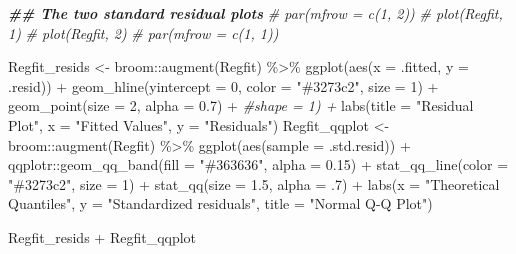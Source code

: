 \documentclass[
]{book}
\newenvironment{Shaded}{\begin{snugshade}}{\end{snugshade}}
\newcommand{\AttributeTok}[1]{\textcolor[rgb]{0.77,0.63,0.00}{#1}}
\newcommand{\CommentTok}[1]{\textcolor[rgb]{0.56,0.35,0.01}{\textit{#1}}}
\newcommand{\DecValTok}[1]{\textcolor[rgb]{0.00,0.00,0.81}{#1}}
\newcommand{\DocumentationTok}[1]{\textcolor[rgb]{0.56,0.35,0.01}{\textbf{\textit{#1}}}}
\newcommand{\FloatTok}[1]{\textcolor[rgb]{0.00,0.00,0.81}{#1}}
\newcommand{\FunctionTok}[1]{\textcolor[rgb]{0.00,0.00,0.00}{#1}}
\newcommand{\NormalTok}[1]{#1}
\newcommand{\OtherTok}[1]{\textcolor[rgb]{0.56,0.35,0.01}{#1}}
\newcommand{\SpecialCharTok}[1]{\textcolor[rgb]{0.00,0.00,0.00}{#1}}
\newcommand{\StringTok}[1]{\textcolor[rgb]{0.31,0.60,0.02}{#1}}
\begin{document}
\begin{Shaded}
\begin{Highlighting}[]
\DocumentationTok{\#\# The two standard residual plots}
\CommentTok{\# par(mfrow = c(1, 2))}
\CommentTok{\# plot(Regfit, 1)}
\CommentTok{\# plot(Regfit, 2)}
\CommentTok{\# par(mfrow = c(1, 1))}

\NormalTok{Regfit\_resids }\OtherTok{\textless{}{-}}\NormalTok{ broom}\SpecialCharTok{::}\FunctionTok{augment}\NormalTok{(Regfit) }\SpecialCharTok{\%\textgreater{}\%} 
  \FunctionTok{ggplot}\NormalTok{(}\FunctionTok{aes}\NormalTok{(}\AttributeTok{x =}\NormalTok{ .fitted, }\AttributeTok{y =}\NormalTok{ .resid)) }\SpecialCharTok{+} 
  \FunctionTok{geom\_hline}\NormalTok{(}\AttributeTok{yintercept =} \DecValTok{0}\NormalTok{, }\AttributeTok{color =} \StringTok{"\#3273c2"}\NormalTok{, }\AttributeTok{size =} \DecValTok{1}\NormalTok{) }\SpecialCharTok{+}
  \FunctionTok{geom\_point}\NormalTok{(}\AttributeTok{size =} \DecValTok{2}\NormalTok{, }\AttributeTok{alpha =} \FloatTok{0.7}\NormalTok{) }\SpecialCharTok{+} \CommentTok{\#shape = 1) +}
  \FunctionTok{labs}\NormalTok{(}\AttributeTok{title =} \StringTok{"Residual Plot"}\NormalTok{, }
       \AttributeTok{x =} \StringTok{"Fitted Values"}\NormalTok{, }
       \AttributeTok{y =} \StringTok{"Residuals"}\NormalTok{)}
\NormalTok{Regfit\_qqplot }\OtherTok{\textless{}{-}}\NormalTok{ broom}\SpecialCharTok{::}\FunctionTok{augment}\NormalTok{(Regfit) }\SpecialCharTok{\%\textgreater{}\%} 
  \FunctionTok{ggplot}\NormalTok{(}\FunctionTok{aes}\NormalTok{(}\AttributeTok{sample =}\NormalTok{ .std.resid)) }\SpecialCharTok{+}
\NormalTok{  qqplotr}\SpecialCharTok{::}\FunctionTok{geom\_qq\_band}\NormalTok{(}\AttributeTok{fill =} \StringTok{"\#363636"}\NormalTok{, }\AttributeTok{alpha =} \FloatTok{0.15}\NormalTok{) }\SpecialCharTok{+}
  \FunctionTok{stat\_qq\_line}\NormalTok{(}\AttributeTok{color =} \StringTok{"\#3273c2"}\NormalTok{, }\AttributeTok{size =} \DecValTok{1}\NormalTok{) }\SpecialCharTok{+}
  \FunctionTok{stat\_qq}\NormalTok{(}\AttributeTok{size =} \FloatTok{1.5}\NormalTok{, }\AttributeTok{alpha =}\NormalTok{ .}\DecValTok{7}\NormalTok{) }\SpecialCharTok{+}
  \FunctionTok{labs}\NormalTok{(}\AttributeTok{x =} \StringTok{"Theoretical Quantiles"}\NormalTok{,}
       \AttributeTok{y =} \StringTok{"Standardized residuals"}\NormalTok{,}
       \AttributeTok{title =} \StringTok{"Normal Q{-}Q Plot"}\NormalTok{)}

\NormalTok{Regfit\_resids }\SpecialCharTok{+}\NormalTok{ Regfit\_qqplot}
\end{Highlighting}
\end{Shaded}
\end{document}
